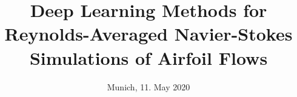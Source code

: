 %
% 
% 
%






\renewcommand{\PersonTitel}{}
\newcommand{\Datum}{\today}

\renewcommand{\PraesentationFusszeileZusatz}{| \LehrstuhlName}

\title{Deep Learning Methods for Reynolds-Averaged Navier-Stokes Simulations of Airfoil Flows}
\author{\PersonTitel{} \PersonVorname{} \PersonNachname}
\institute[]{\UniversitaetName \\ \LehrstuhlName}
\date[\Datum]{Munich, 11. May 2020}




\PraesentationMasterStandard

\PraesentationTitelseite %












